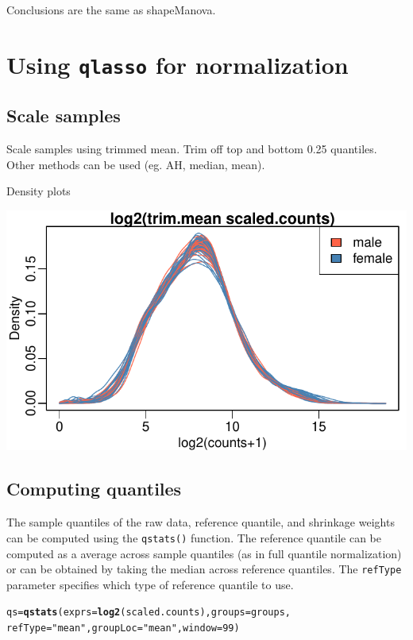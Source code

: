 \documentclass{article}\usepackage[]{graphicx}\usepackage[usenames,dvipsnames]{color}
\makeatletter
\def\maxwidth{ %
  \ifdim\Gin@nat@width>\linewidth
    \linewidth
  \else
    \Gin@nat@width
  \fi
}
\newcommand{\hlnum}[1]{\textcolor[rgb]{0.686,0.059,0.569}{#1}}%
\newcommand{\hlstr}[1]{\textcolor[rgb]{0.192,0.494,0.8}{#1}}%
\newcommand{\hlstd}[1]{\textcolor[rgb]{0.345,0.345,0.345}{#1}}%
\newcommand{\hlkwb}[1]{\textcolor[rgb]{0.69,0.353,0.396}{#1}}%
\newcommand{\hlkwc}[1]{\textcolor[rgb]{0.333,0.667,0.333}{#1}}%
\newcommand{\hlkwd}[1]{\textcolor[rgb]{0.737,0.353,0.396}{\textbf{#1}}}%
\newenvironment{kframe}{%
 \def\at@end@of@kframe{}%
 \ifinner\ifhmode%
  \def\at@end@of@kframe{\end{minipage}}%
  \begin{minipage}{\columnwidth}%
 \fi\fi%
 \def\FrameCommand##1{\hskip\@totalleftmargin \hskip-\fboxsep
 \colorbox{shadecolor}{##1}\hskip-\fboxsep
     \hskip-\linewidth \hskip-\@totalleftmargin \hskip\columnwidth}%
 \MakeFramed {\advance\hsize-\width
   \@totalleftmargin\z@ \linewidth\hsize
   \@setminipage}}%
 {\par\unskip\endMakeFramed%
 \at@end@of@kframe}
\newenvironment{knitrout}{}{} %
\makeatother
\begin{document}
Conclusions are the same as shapeManova. 

\section{Using \texttt{qlasso} for normalization}

\subsection{Scale samples}
Scale samples using trimmed mean. Trim off top and bottom 0.25 quantiles.
Other methods can be used (eg. AH, median, mean).

Density plots
\begin{knitrout}
\color{fgcolor}

{\centering \includegraphics[width=\maxwidth]{figure/scale-counts-1} 

}



\end{knitrout}


\subsection{Computing quantiles}

The sample quantiles of the raw data, reference quantile, 
and shrinkage weights can be computed using the 
\texttt{qstats()} function. The reference quantile 
can be computed as a average across sample quantiles 
(as in full quantile normalization) or can be obtained
by taking the median across reference quantiles. 
The \texttt{refType} parameter specifies which type
of reference quantile to use.

\begin{knitrout}
\color{fgcolor}\begin{kframe}
\begin{alltt}
\hlstd{qs} \hlkwb{=} \hlkwd{qstats}\hlstd{(}\hlkwc{exprs}\hlstd{=}\hlkwd{log2}\hlstd{(scaled.counts),} \hlkwc{groups}\hlstd{=groups,}
            \hlkwc{refType}\hlstd{=}\hlstr{"mean"}\hlstd{,} \hlkwc{groupLoc}\hlstd{=}\hlstr{"mean"}\hlstd{,} \hlkwc{window}\hlstd{=}\hlnum{99}\hlstd{)}
\end{alltt}
\end{kframe}
\end{knitrout}
\end{document}
